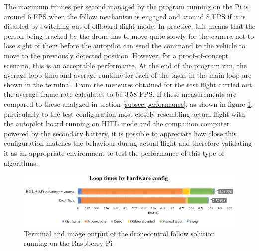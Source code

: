 The maximum frames per second managed by the program running on the Pi is around 6 FPS when the follow mechanism is engaged and around 8 FPS if it is disabled by switching out of offboard flight mode.
In practice, this means that the person being tracked by the drone has to move quite slowly for the camera not to lose sight of them before the autopilot can send the command to the vehicle to move to the previously detected position.
However, for a proof-of-concept scenario, this is an acceptable performance.
At the end of the program run, the average loop time and average runtime for each of the tasks in the main loop are shown in the terminal.
From the measures obtained for the test flight carried out, the average frame rate calculates to be 3.58 FPS.
If these measurements are compared to those analyzed in section \ref{subsec:performance}, as shown in figure \ref{fig:flight-performance}, particularly to the test configuration most closely resembling actual flight with the autopilot board running on HITL mode and the companion computer powered by the secondary battery, it is possible to appreciate how close this configuration matches the behaviour during actual flight and therefore validating it as an appropriate environment to test the performance of this type of algorithms.


\begin{figure}
  \centering
  \includegraphics[width=\textwidth, keepaspectratio]{img/perf-hitl-flight.png}
  \caption{Terminal and image output of the dronecontrol follow solution running on the Raspberry Pi}
  \label{fig:flight-performance}
\end{figure}
